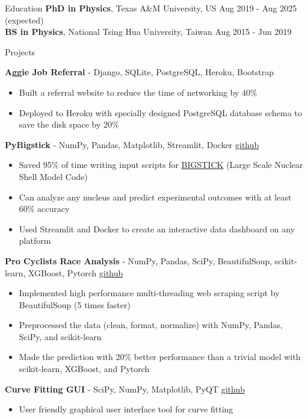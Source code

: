 \documentclass{resume}
\begin{document}
\vspace{-2.75em}
\begin{rSection}{Education}
{\bf PhD in Physics}, Texas A\&M University, US \hfill {Aug 2019 - Aug 2025 (expected)} \\
{\bf BS in Physics}, National Tsing Hua University, Taiwan \hfill {Aug 2015 - Jun 2019}
\vspace{-0.5em}


\begin{rSection}{Projects}
    \vspace{-1.25em}
    \item \textbf{Aggie Job Referral} - {Django, SQLite, PostgreSQL, Heroku, Bootstrap}
        \begin{itemize}
        \itemsep -3pt {}
        \item Built a referral website to reduce the time of networking by 40\%
        \item Deployed to Heroku with specially designed PostgreSQL database schema to save the disk space by 20\%
        \end{itemize}
    \item \textbf{PyBigstick} - {NumPy, Pandas, Matplotlib, Streamlit, Docker} \hfill {\href{https://github.com/noctildon/pyBigstick}{github}}
        \begin{itemize}
        \itemsep -3pt {}
        \item Saved 95\% of time writing input scripts for \href{https://github.com/cwjsdsu/BigstickPublick}{BIGSTICK} (Large Scale Nuclear Shell Model Code)
        \item Can analyze any nucleus and predict experimental outcomes with at least 60\% accuracy
        \item Used Streamlit and Docker to create an interactive data dashboard on any platform
        \end{itemize}
    \item \textbf{Pro Cyclists Race Analysis} - {NumPy, Pandas, SciPy, BeautifulSoup, scikit-learn, XGBoost, Pytorch} \hfill {\href{https://github.com/noctildon/pro_cyclists}{github}}
        \begin{itemize}
        \itemsep -3pt {}
        \item Implemented high performance multi-threading web scraping script by BeautifulSoup (5 times faster)
        \item Preprocessed the data (clean, format, normalize) with NumPy, Pandas, SciPy, and scikit-learn
        \item Made the prediction with 20\% better performance than a trivial model with scikit-learn, XGBoost, and Pytorch
        \end{itemize}
    \item \textbf{Curve Fitting GUI} - {SciPy, NumPy, Matplotlib, PyQT} \hfill {\href{https://github.com/noctildon/curve_fitting}{github}}
        \begin{itemize}
        \itemsep -3pt {}
        \item User friendly graphical user interface tool for curve fitting
        \end{itemize}
\end{rSection}




\end{rSection}
\end{document}

